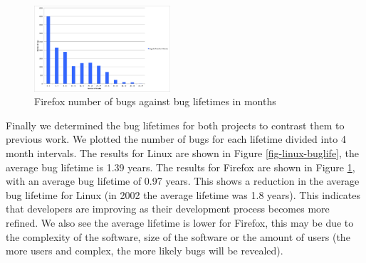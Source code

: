 \begin{figure}
\begin{center}
\includegraphics[width=0.45\textwidth]{firefox_bug_life.png}
\end{center}
\caption{Firefox number of bugs against bug lifetimes in months}
\label{fig-firefox-buglife}
\end{figure}

Finally we determined the bug lifetimes for both projects to contrast
them to previous work. We plotted the number of bugs for each lifetime
divided into 4 month intervals. The results for Linux are shown in
Figure \ref{fig-linux-buglife}, the average bug lifetime is 1.39
years. The results for Firefox are shown in Figure
\ref{fig-firefox-buglife}, with an average bug lifetime of 0.97
years. This shows a reduction in the average bug lifetime for Linux (in
2002 the average lifetime was 1.8 years). This indicates that
developers are improving as their development process becomes more
refined. We also see the average lifetime is lower for Firefox, this
may be due to the complexity of the software, size of the software or
the amount of users (the more users and complex, the more likely bugs will be
revealed).


